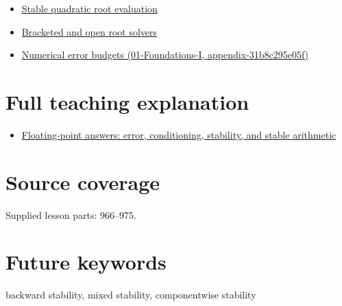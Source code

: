 \begin{itemize}
\tightlist
\item
  \hyperref[appendix-b9afba7f63e5]{Stable quadratic root evaluation}
\item
  \hyperref[appendix-f63eb850796d]{Bracketed and open root solvers}
\item
  \href{../01-Foundations-I/main.pdf\#nameddest=appendix-31b8c295e05f}{Numerical error budgets (01-Foundations-I, appendix-31b8c295e05f)}
\end{itemize}

\section{Full teaching explanation}\label{appendix-aa2bf0d79639-full-teaching-explanation}

\begin{itemize}
\tightlist
\item
  \href{Continuous\%20Notes/Computing\%20Foundations\%20-\%20From\%20Bits\%20to\%20C++\%20and\%20Systems\%20APIs\#Floating-point\%20answers:\%20error,\%20conditioning,\%20stability,\%20and\%20stable\%20arithmetic}{Floating-point answers: error, conditioning, stability, and stable arithmetic}
\end{itemize}

\section{Source coverage}\label{appendix-aa2bf0d79639-source-coverage}

Supplied lesson parts: 966--975.

\section{Future keywords}\label{appendix-aa2bf0d79639-future-keywords}

backward stability, mixed stability, componentwise stability
